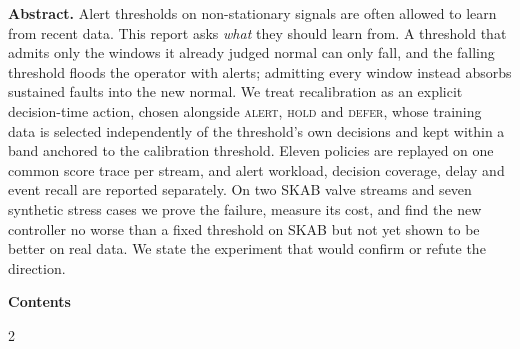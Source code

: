 \setcounter{page}{2}

\begin{center}
  \begin{minipage}{0.92\linewidth}
  \small
  \textbf{Abstract.}
  Alert thresholds on non-stationary signals are often allowed to learn from recent
  data. This report asks \emph{what} they should learn from. A threshold that admits
  only the windows it already judged normal can only fall, and the falling threshold
  floods the operator with alerts; admitting every window instead absorbs sustained
  faults into the new normal. We treat recalibration as an explicit decision-time
  action, chosen alongside \textsc{alert}, \textsc{hold} and \textsc{defer}, whose
  training data is selected independently of the threshold's own decisions and kept
  within a band anchored to the calibration threshold. Eleven policies are replayed on
  one common score trace per stream, and alert workload, decision coverage, delay and
  event recall are reported separately. On two SKAB valve streams and seven synthetic
  stress cases we prove the failure, measure its cost, and find the new controller no
  worse than a fixed threshold on SKAB but not yet shown to be better on real data. We
  state the experiment that would confirm or refute the direction.
  \end{minipage}
\end{center}

{\hypersetup{linkcolor=ink}\setcounter{tocdepth}{1}\setlength{\parskip}{0pt}%
 \makeatletter\renewcommand\tableofcontents{\@starttoc{toc}}%
 \renewcommand*\l@section[2]{\@dottedtocline{1}{0pt}{1.6em}{\small #1}{\small #2}\vspace{1pt}}\makeatother
 \noindent\textbf{Contents}\par\vspace{2pt}
 \begin{multicols}{2}\tableofcontents\end{multicols}}

